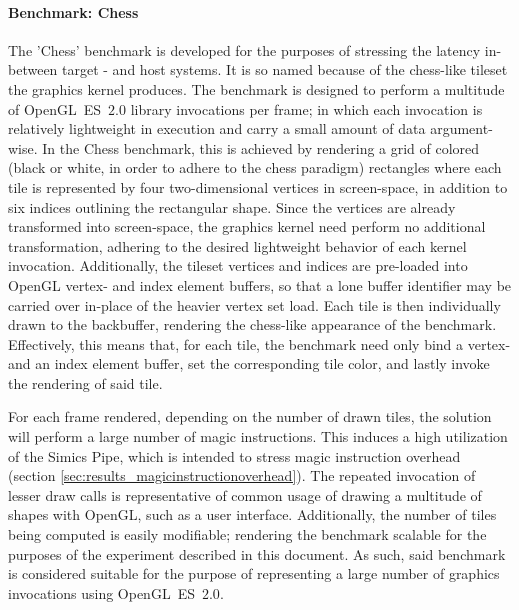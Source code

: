\paragraph{Benchmark: Chess}
\label{par:experimentalmethodology_benchmarking_benchmarkchess}
The 'Chess' benchmark is developed for the purposes of stressing the latency in-between target - and host systems.
It is so named because of the chess-like tileset the graphics kernel produces.
The benchmark is designed to perform a multitude of OpenGL~ES~$2.0$ library invocations per frame; in which each invocation is relatively lightweight in execution and carry a small amount of data argument-wise.
In the Chess benchmark, this is achieved by rendering a grid of colored (black or white, in order to adhere to the chess paradigm) rectangles where each tile is represented by four two-dimensional vertices in screen-space, in addition to six indices outlining the rectangular shape.
Since the vertices are already transformed into screen-space, the graphics kernel need perform no additional transformation, adhering to the desired lightweight behavior of each kernel invocation.
Additionally, the tileset vertices and indices are pre-loaded into OpenGL vertex- and index element buffers, so that a lone buffer identifier may be carried over in-place of the heavier vertex set load.
Each tile is then individually drawn to the backbuffer, rendering the chess-like appearance of the benchmark.
Effectively, this means that, for each tile, the benchmark need only bind a vertex- and an index element buffer, set the corresponding tile color, and lastly invoke the rendering of said tile.

For each frame rendered, depending on the number of drawn tiles, the solution will perform a large number of magic instructions.
This induces a high utilization of the Simics Pipe, which is intended to stress magic instruction overhead (section \ref{sec:results_magicinstructionoverhead}).
The repeated invocation of lesser draw calls is representative of common usage of drawing a multitude of shapes with OpenGL, such as a user interface. Additionally, the number of tiles being computed is easily modifiable; rendering the benchmark scalable for the purposes of the experiment described in this document. As such, said benchmark is considered suitable for the purpose of representing a large number of graphics invocations using OpenGL~ES~$2.0$.

